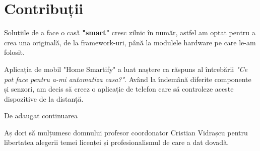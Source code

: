 \chapter*{Contribuții}
Soluțiile de a face o casă \textbf{"smart"} cresc zilnic în număr, astfel am optat pentru a crea una originală, de la framework-uri, până la modulele hardware pe care le-am folosit.

Aplicația de mobil "Home Smartify" a luat naștere ca răspuns al întrebării \emph{"Ce pot face pentru a-mi automatiza casa?"}. Având la îndemână diferite componente și senzori, am decis să creez o aplicație de telefon care să controleze aceste dispozitive de la distanță.

De adaugat continuarea

Aș dori să mulțumesc domnului profesor coordonator Cristian Vidrașcu pentru libertatea alegerii temei licenței și profesionalismul de care a dat dovadă.
